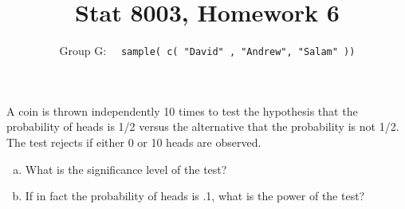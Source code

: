 \documentclass[12pt]{article}
\newenvironment{question}[2][Question]{\begin{trivlist}
\item[\hskip \labelsep {\bfseries #1}\hskip \labelsep {\bfseries #2.}]}{\end{trivlist}}
\begin{document}
 \renewcommand{\arraystretch}{1.3}
 \renewcommand{\thefootnote}{\fnsymbol{footnote}}	
 
\title{Stat 8003, Homework 6}%
\author{Group G: \ \ \texttt{sample( c( "David" , "Andrew",  "Salam" ))}
\\ %
} %
 
\maketitle
 
 \begin{question}{6.1}  A coin is thrown independently 10 times to test the hypothesis that the probability of heads is
1/2 versus the alternative that the probability is not 1/2. The test rejects if either 0 or 10 heads
are observed.

\begin{enumerate}[(a)]
\item What is the significance level of the test?
\item If in fact the probability of heads is .1, what is the power of the test?
\end{enumerate}

\end{question} 
\end{document}
